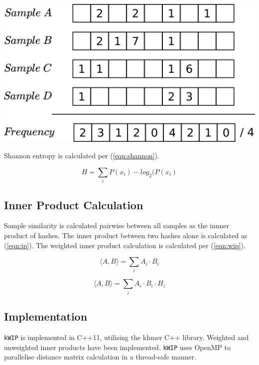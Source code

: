 \documentclass[a0,portrait]{a0poster}
\begin{document}
\begin{multicols}{2}
\begin{center}
  \vspace{1cm}
  \includegraphics[width=25cm]{freq_vector.png}
  \vspace{1cm}
\end{center}

Shannon entropy is calculated per (\ref{eqn:shannon}).

\begin{equation}
  H = \sum_{i} P(x_i) -log_2(P(x_i)
\label{eqn:shannon}
\end{equation}

\subsection*{Inner Product Calculation}

Sample similarity is calculated pairwise between all samples as the innner
product of hashes. The inner product between two hashes alone is calculated as
(\ref{eqn:ip}). The weighted inner product calculation is calculated per
(\ref{eqn:wip}).

\begin{equation}
  \langle A, B \rangle = \sum_{i} A_i \cdot B_i
\label{eqn:ip}
\end{equation}

\begin{equation}
  \langle A, B \rangle = \sum_{i} A_i \cdot B_i \cdot H_i
\label{eqn:wip}
\end{equation}

\subsection*{Implementation}

\texttt{kWIP} is implemented in C++11, utilising the khmer C++ library. Weighted
and unweighted inner products have been implemented. \texttt{kWIP} uses OpenMP
to parallelise distance matrix calculation in a thread-safe manner.



\end{multicols}
\end{document}
